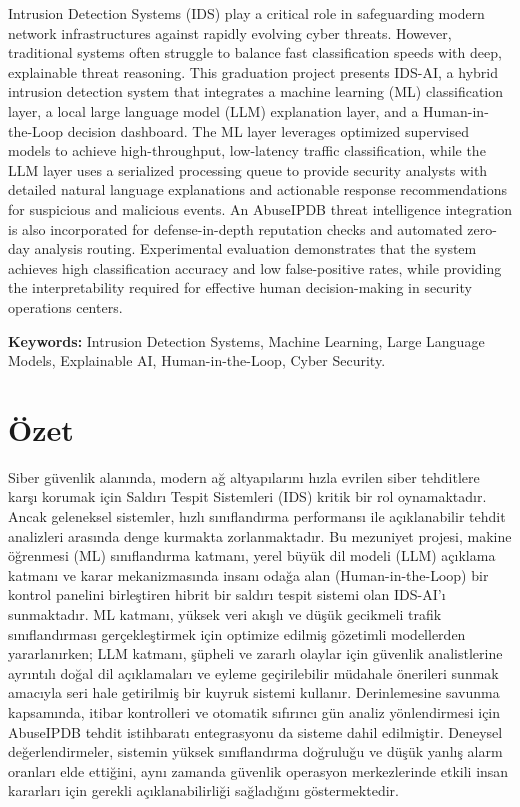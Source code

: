 \documentclass[12pt,a4paper]{report}
\begin{document}
Intrusion Detection Systems (IDS) play a critical role in safeguarding modern network infrastructures against rapidly evolving cyber threats. However, traditional systems often struggle to balance fast classification speeds with deep, explainable threat reasoning. This graduation project presents IDS-AI, a hybrid intrusion detection system that integrates a machine learning (ML) classification layer, a local large language model (LLM) explanation layer, and a Human-in-the-Loop decision dashboard. The ML layer leverages optimized supervised models to achieve high-throughput, low-latency traffic classification, while the LLM layer uses a serialized processing queue to provide security analysts with detailed natural language explanations and actionable response recommendations for suspicious and malicious events. An AbuseIPDB threat intelligence integration is also incorporated for defense-in-depth reputation checks and automated zero-day analysis routing. Experimental evaluation demonstrates that the system achieves high classification accuracy and low false-positive rates, while providing the interpretability required for effective human decision-making in security operations centers.

\vspace{1.5cm}
\noindent\textbf{Keywords:} Intrusion Detection Systems, Machine Learning, Large Language Models, Explainable AI, Human-in-the-Loop, Cyber Security.

\clearpage

\chapter*{Özet}

Siber güvenlik alanında, modern ağ altyapılarını hızla evrilen siber tehditlere karşı korumak için Saldırı Tespit Sistemleri (IDS) kritik bir rol oynamaktadır. Ancak geleneksel sistemler, hızlı sınıflandırma performansı ile açıklanabilir tehdit analizleri arasında denge kurmakta zorlanmaktadır. Bu mezuniyet projesi, makine öğrenmesi (ML) sınıflandırma katmanı, yerel büyük dil modeli (LLM) açıklama katmanı ve karar mekanizmasında insanı odağa alan (Human-in-the-Loop) bir kontrol panelini birleştiren hibrit bir saldırı tespit sistemi olan IDS-AI'ı sunmaktadır. ML katmanı, yüksek veri akışlı ve düşük gecikmeli trafik sınıflandırması gerçekleştirmek için optimize edilmiş gözetimli modellerden yararlanırken; LLM katmanı, şüpheli ve zararlı olaylar için güvenlik analistlerine ayrıntılı doğal dil açıklamaları ve eyleme geçirilebilir müdahale önerileri sunmak amacıyla seri hale getirilmiş bir kuyruk sistemi kullanır. Derinlemesine savunma kapsamında, itibar kontrolleri ve otomatik sıfırıncı gün analiz yönlendirmesi için AbuseIPDB tehdit istihbaratı entegrasyonu da sisteme dahil edilmiştir. Deneysel değerlendirmeler, sistemin yüksek sınıflandırma doğruluğu ve düşük yanlış alarm oranları elde ettiğini, aynı zamanda güvenlik operasyon merkezlerinde etkili insan kararları için gerekli açıklanabilirliği sağladığını göstermektedir.
\end{document}
